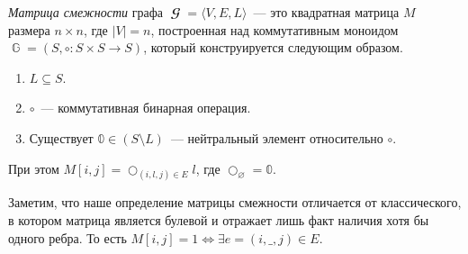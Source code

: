 \begin{definition}
    \emph{Матрица смежности} графа $\mbfscrG = \langle V, E, L \rangle$~--- это квадратная матрица $M$ размера $n \times n$, где $|V| = n$, построенная над коммутативным моноидом $\BbbG = (S, \circ: S \times S \to S)$, который конструируется следующим образом.
    \begin{enumerate}
        \item $L \subseteq S$.
        \item $\circ$~--- коммутативная бинарная операция.
        \item Существует $\Bbbzero \in (S \setminus L)$~--- нейтральный элемент относительно $\circ$.
    \end{enumerate}
    При этом $M[i,j] = \bigcirc_{(i, l, j) \in E}l$, где $\bigcirc_\varnothing = \Bbbzero$.
\end{definition}

Заметим, что наше определение матрицы смежности отличается от классического, в котором матрица является булевой и отражает лишь факт наличия хотя бы одного ребра.
То есть $M[i,j] = 1 \iff \exists e = (i,\_,j) \in E$.

